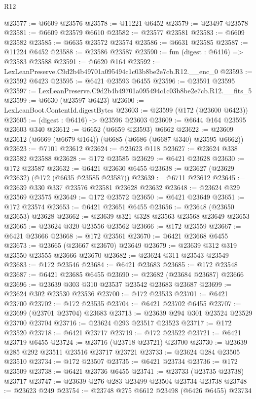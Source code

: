 \begin{lexlean}{R12}
\begin{coremodule}
@23577 := @6609 @23576
@23578 := @11221 @6452
@23579 := @23497 @23578
@23581 := @6609 @23579 @6610
@23582 := @23577 @23581
@23583 := @6609 @23582
@23585 := @6635 @23572 @23574
@23586 := @6631 @23585
@23587 := @11224 @6452
@23588 := @23586 @23587
@23590 := fun (digest : @6416) => @23583 @23588
@23591 := @6620 @164
@23592 := LexLeanPreserve.C9d2b4b49701a095494c1c03b8be2e7cb.R12.__enc_0
@23593 := @23592 @6423
@23595 := @6421 @23593 @6455
@23596 := @23591 @23595
@23597 := LexLeanPreserve.C9d2b4b49701a095494c1c03b8be2e7cb.R12.__fits_5
@23599 := @6630 (@23597 @6423)
@23600 := LexLeanBoot.ContentId.digestBytes
@23603 := @23599 (@172 (@23600 @6423))
@23605 := (digest : @6416) -> @23596 @23603
@23609 := @6644 @164 @23595 @23603 @340
@23612 := @6652 (@6659 @23593) @6662
@23622 := @23609 @23612 (@6669 (@6679 @164)) (@6685 (@6686 (@6687 @340) @23595 @6662))
@23623 := @7101 @23612
@23624 := @23623 @118
@23627 := @23624 @338 @23582 @23588
@23628 := @172 @23585
@23629 := @6421 @23628
@23630 := @172 @23587
@23632 := @6421 @23630 @6455
@23638 := @23627 (@23629 @23632) (@172 (@6635 @23585 @23587))
@23639 := @6711 @23612
@23645 := @23639 @330 @337 @23576 @23581 @23628 @23632
@23648 := @23624 @329 @23569 @23575
@23649 := @172 @23572
@23650 := @6421 @23649
@23651 := @172 @23574
@23653 := @6421 @23651 @6455
@23656 := @23648 (@23650 @23653) @23628
@23662 := @23639 @321 @328 @23563 @23568 @23649 @23653
@23665 := @23624 @320 @23556 @23562
@23666 := @172 @23559
@23667 := @6421 @23666
@23668 := @172 @23561
@23670 := @6421 @23668 @6455
@23673 := @23665 (@23667 @23670) @23649
@23679 := @23639 @312 @319 @23550 @23555 @23666 @23670
@23682 := @23624 @311 @23543 @23549
@23683 := @172 @23546
@23684 := @6421 @23683
@23685 := @172 @23548
@23687 := @6421 @23685 @6455
@23690 := @23682 (@23684 @23687) @23666
@23696 := @23639 @303 @310 @23537 @23542 @23683 @23687
@23699 := @23624 @302 @23530 @23536
@23700 := @172 @23533
@23701 := @6421 @23700
@23702 := @172 @23535
@23704 := @6421 @23702 @6455
@23707 := @23699 (@23701 @23704) @23683
@23713 := @23639 @294 @301 @23524 @23529 @23700 @23704
@23716 := @23624 @293 @23517 @23523
@23717 := @172 @23520
@23718 := @6421 @23717
@23719 := @172 @23522
@23721 := @6421 @23719 @6455
@23724 := @23716 (@23718 @23721) @23700
@23730 := @23639 @285 @292 @23511 @23516 @23717 @23721
@23733 := @23624 @284 @23505 @23510
@23734 := @172 @23507
@23735 := @6421 @23734
@23736 := @172 @23509
@23738 := @6421 @23736 @6455
@23741 := @23733 (@23735 @23738) @23717
@23747 := @23639 @276 @283 @23499 @23504 @23734 @23738
@23748 := @23623 @249
@23754 := @23748 @275 @6612 @23498 (@6426 @6455) @23734

\end{coremodule}
\end{lexlean}
